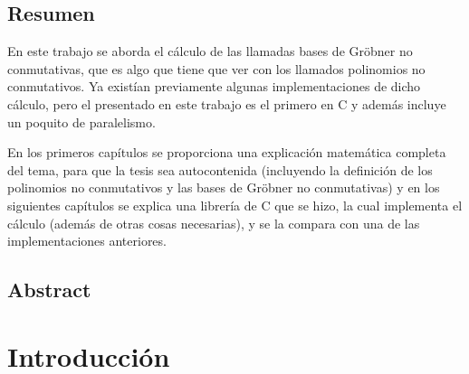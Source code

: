 \documentclass[12pt]{report}
\theoremstyle{customstyle}
\theoremstyle{factstyle}
\newcommand\cpp{C\nolinebreak[4]\hspace{-.05em}\raisebox{.4ex}{\relsize{-3}{\textbf{++}}}\xspace}
\begin{document}
\def\tituloTesis{Implementación de bases de Gröbner no conmutativas en \cpp con un poquito de paralelismo} %


\section*{Resumen}

En este trabajo se aborda el cálculo de las llamadas bases de Gröbner no conmutativas, que es algo que tiene que ver con los llamados polinomios no conmutativos. Ya existían previamente algunas implementaciones de dicho cálculo, pero el presentado en este trabajo es el primero en \cpp y además incluye un poquito de paralelismo.

En los primeros capítulos se proporciona una explicación matemática completa del tema, para que la tesis sea autocontenida (incluyendo la definición de los polinomios no conmutativos y las bases de Gröbner no conmutativas) y en los siguientes capítulos se explica una librería de \cpp que se hizo, la cual implementa el cálculo (además de otras cosas necesarias), y se la compara con una de las implementaciones anteriores.

\section*{Abstract} %








\tableofcontents

\chapter{Introducción}
\end{document}
